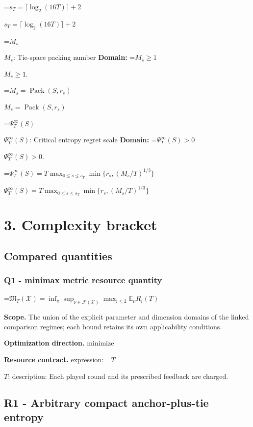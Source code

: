 \documentclass[10pt,a4paper]{article}
\newcommand{\AtlasMath}[1]{\par\begingroup\centering\setbox0=\hbox{$\displaystyle #1$}\ifdim\wd0>1.4\linewidth\typeout{ATLAS WIDE FORMULA: \the\wd0}\fi\ifdim\wd0>\linewidth\resizebox{\linewidth}{!}{\box0}\else\box0\fi\par\endgroup}
\newcommand{\AtlasInlineMath}[1]{\begingroup\setbox0=\hbox{$#1$}\ifdim\wd0>.4\linewidth\endgroup\AtlasMath{#1}\else\endgroup$#1$\fi}
\begin{document}
\AtlasInlineMath{s_T=\lceil\log_2(16T)\rceil+2}



\AtlasInlineMath{M_s}: Tie-space packing number \textbf{Domain:} \AtlasInlineMath{M_s\ge1}.



\AtlasInlineMath{M_s=\operatorname{Pack}(S,r_s)}



\AtlasInlineMath{\Psi_T^\infty(S)}: Critical entropy regret scale \textbf{Domain:} \AtlasInlineMath{\Psi_T^\infty(S)>0}.



\AtlasInlineMath{\Psi_T^\infty(S)=T\max_{0\le s\le s_T}\min\{r_s,(M_s/T)^{1/3}\}}



\section{3. Complexity bracket}


\subsection{Compared quantities}


\subsubsection{Q1 - minimax metric resource quantity}


\AtlasMath{\mathfrak M_T(\mathcal X)=\inf_\pi\sup_{\nu\in\mathcal F(\mathcal X)}\max_{i\le2}\mathbb E_\nu R_i(T)}


\textbf{Scope.} The union of the explicit parameter and dimension domains of the linked comparison regimes; each bound retains its own applicability conditions.



\textbf{Optimization direction.} minimize



\textbf{Resource contract.} expression: \AtlasInlineMath{T}; description: Each played round and its prescribed feedback are charged.



\subsection{R1 - Arbitrary compact anchor-plus-tie entropy}
\end{document}
